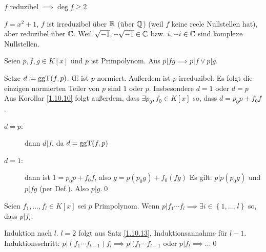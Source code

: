 \begin{subnote*}
	$ f $ reduzibel $ \implies \deg f \geq 2 $
\end{subnote*}

\begin{subexample}
	$ f = x^2 + 1 $, $ f $ ist irreduzibel über $ \mathbb{R}  $ (über $ \mathbb{Q}  $) (weil $ f $ keine reele Nullstellen hat), aber reduzibel über $ \mathbb{C}  $.
	Weil $ \sqrt{-1} , - \sqrt{-1} \in \mathbb{C}  $ bzw. $ i, -i \in \mathbb{C}  $ sind komplexe Nullstellen.
\end{subexample}

\begin{subtheorem}
	Seien $ p, f,g \in K[x] $ und $ p $ ist Primpolynom.
	Aus $ p | fg \implies p | f \vee p | g $.
\end{subtheorem}
\begin{subproof*}
	Setze $ d \coloneqq  \operatorname{ggT} (f, p) $. \OE{} ist $ p $ normiert.
	Außerdem ist $ p $ irreduzibel.
	Es folgt die einzigen normierten Teiler von $ p $ sind $ 1 $ oder $ p $.
	Insbesondere $ d = 1 $ oder $ d = p $
	Aus Korollar \ref{1.10.10} folgt außerdem, dass $ \exists p_0, f_0 \in K[x] $ so, dass $ d = p_0 p + f_0 f $.
	\begin{description}
		\item[$ d = p $:] dann $ d | f $, da $ d = \operatorname{ggT} (f, p) $ 
		\item[$ d = 1 $:] dann ist $ 1 = p_0p + f_0f $, also $ g = p (p_0g) + f_0 (fg) $
			Es gilt: $ p | p(p_0g) $ und $ p | fg $ (per Def.). Also $ p | g $.\qed
	\end{description}
\end{subproof*}

\begin{subcorollary}
	Seien $ f_1, \dotsc, f_l \in K[x] $ sei $ p $ Primpolynom.
	Wenn $ p | f_1 \dotsb f_l \implies \exists i \in \left\{ 1, \dotsc, l \right\}  $ so, dass $ p | f_i $.
\end{subcorollary}
\begin{subproof*}
	Induktion nach $ l $.
	$ l = 2 $ folgt aus Satz \ref{1.10.13}.
	Induktionsannahme für $ l - 1 $.
	Induktionsschritt: $  p | (f_1 \dotsb f_{l - 1} ) f_l \implies p | (f_1 \dotsb f_{l - 1}  $ oder $ p | f_l \implies \dotsc $\qed
\end{subproof*}

